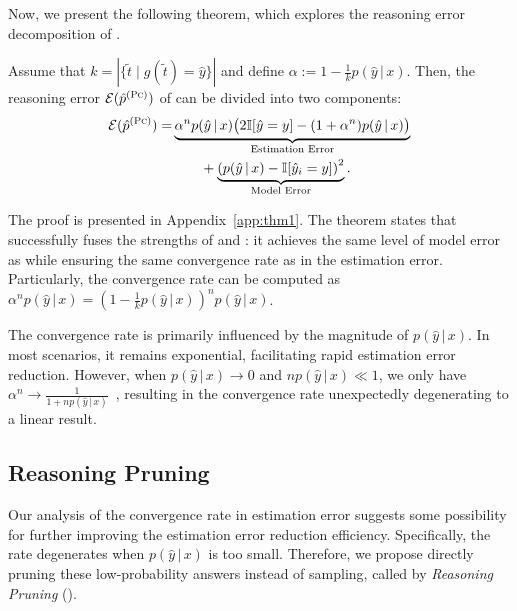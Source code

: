 Now, we present the following theorem, which explores the reasoning error decomposition of \PC.

\begin{theorem} \label{thm:thm1}
Assume that $k = |\{\tilde{t} \mid g(\tilde{t}) = \hat{y}\}|$ and define $\alpha := 1 - \frac{1}{k} p(\hat{y} \,|\, x)$. 
Then, the reasoning error $\mathcal{E}(\hat{p}^{(\textsc{Pc})})$ of \PC can be divided into two components:
\begin{equation*}
    \begin{aligned}
      \mathcal{E}(\hat{p}^{(\textsc{Pc})}) 
      = & \underbrace{ \alpha^n p(\hat{y} \,|\, x) \big(2\mathbb{I}[\hat{y}=y] - (1 + \alpha^n) p(\hat{y} \,|\, x) \big) }_{\text{Estimation Error}} \\
        & \qquad + \underbrace{\left( p(\hat{y} \,|\, x) - \mathbb{I}[\hat{y}_i = y] \right )^2}_{\text{Model Error}}. \\
    \end{aligned}
\end{equation*}
\end{theorem}
\begin{remark} 
The proof is presented in Appendix~\ref{app:thm1}. 
The theorem states that \PC successfully fuses the strengths of \PP and \SC: it achieves the same level of model error as \SC while ensuring the same convergence rate as \PP in the estimation error.
Particularly, the convergence rate can be computed as $\alpha^n p(\hat{y}\,|\, x) = (1 - \frac{1}{k} p(\hat{y} \,|\, x))^{n}p(\hat{y}\,|\, x)$. 
\end{remark}

The convergence rate is primarily influenced by the magnitude of $p(\hat{y} \,|\, x)$. In most scenarios, it remains exponential, facilitating rapid estimation error reduction.
However, when $p(\hat{y} \,|\, x) \to 0$ and $np(\hat{y} \,|\, x) \ll 1$, we only have $\alpha^n \to \frac{1}{1 + n p(\hat{y} \,|\, x)}$~\citep{kozma2021useful}, resulting in the convergence rate unexpectedly degenerating to a linear result.

\subsection{Reasoning Pruning}

Our analysis of the convergence rate in estimation error suggests some possibility for further improving the estimation error reduction efficiency.
Specifically, the rate degenerates when $p(\hat{y} \,|\, x)$ is too small.
Therefore, we propose directly pruning these low-probability answers instead of sampling, called by \emph{Reasoning Pruning} (\RP).

